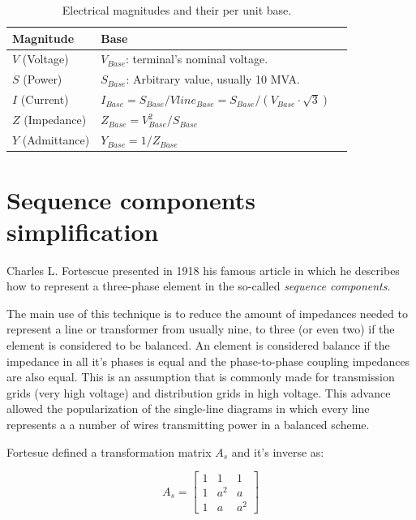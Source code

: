 \documentclass[a4paper,twoside,fleqn]{tufte-book}
\begin{document}
\bigskip
\begin{table}[h!]
\begin{center}
\footnotesize
\begin{tabular}{lll}
\toprule
Magnitude &  Base\\
\midrule
$V$ (Voltage) & $V_{Base}$: terminal's nominal voltage. \\
$S$ (Power) & $S_{Base}$: Arbitrary value, usually 10 MVA. \\
$I$ (Current) & $I_{Base} = S_{Base} / Vline_{Base} = S_{Base} / (V_{Base} \cdot \sqrt{3})$ \\
$Z$ (Impedance) & $Z_{Base} = V_{Base}^2 / S_{Base}$ \\
$Y$ (Admittance) & $Y_{Base} = 1 / Z_{Base}$ \\
\bottomrule
\end{tabular}
\end{center}
  \caption{Electrical magnitudes and their per unit base.}
  \label{magnitudes_and_their_base}
\end{table}


\section{Sequence components simplification}

Charles L. Fortescue presented in 1918 his famous article \cite{fortescue1918method} in which he describes how to represent a three-phase element in the so-called \textit{sequence components}.

The main use of this technique is to reduce the amount of impedances needed to represent a line or transformer from usually nine, to three (or even two) if the element is considered to be balanced. An element is considered balance if the impedance in all it's phases is equal and the phase-to-phase coupling impedances are also equal. This is an assumption that is commonly made for transmission grids (very high voltage) and distribution grids in high voltage. This advance allowed the popularization of the single-line diagrams in which every line represents a  a number of wires transmitting power in a balanced scheme.

Fortesue defined a transformation matrix $A_s$ and it's inverse as:

\begin{equation}
A_s = \left[ \begin{array}{ccc}
1 & 1 & 1 \\
1 & a^2 & a \\
1 & a & a^2
\end{array} \right]
\end{equation}
\end{document}
